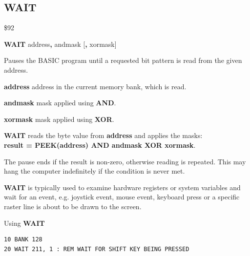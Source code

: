 \subsection{WAIT}
\begin{description}[leftmargin=2cm,style=nextline]
\item [Token:]    \$92

\item [Format:]   {\bf WAIT} address{\bf,} andmask [{\bf,} xormask]

\item [Usage:]    Pauses the BASIC program until a requested bit pattern is read from the given address.

                  {\bf address} address in the current memory bank, which is read.

                  {\bf andmask} mask applied using {\bf AND}.

                  {\bf xormask} mask applied using {\bf XOR}.

                  {\bf WAIT} reads the byte value from {\bf address} and applies the masks: \\
                  {\bf result = PEEK(address) AND andmask XOR xormask}.

                  The pause ends if the result is non-zero, otherwise reading is repeated. This may hang the computer indefinitely if the condition is never met.

\item [Remarks:]  {\bf WAIT} is typically used to examine hardware registers or system variables and wait for an event, e.g. joystick event, mouse event, keyboard press or a specific raster line is about to be drawn to the screen.

\item [Example:]  Using {\bf WAIT}

\begin{tcolorbox}[colback=black,coltext=white]
\verbatimfont{\codefont}
\begin{verbatim}
10 BANK 128
20 WAIT 211, 1 : REM WAIT FOR SHIFT KEY BEING PRESSED
\end{verbatim}
\end{tcolorbox}
\end{description}


\newpage

